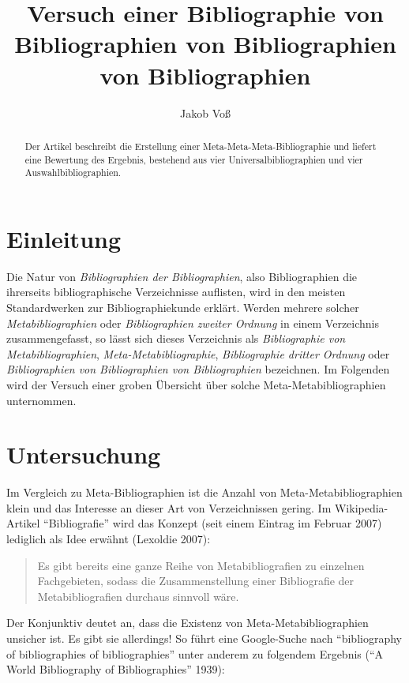 \documentclass[a4paper,
fontsize=11pt,
oneside,
numbers=noperiodatend,
parskip=half-,
bibliography=totoc,
final
]{scrartcl}
\title{\LARGE{Versuch einer Bibliographie von Bibliographien von Bibliographien von Bibliographien}} %
\author{Jakob Voß} %
\date{}
\begin{document}
\maketitle
\thispagestyle{fancyplain} 

\begin{abstract}
Der Artikel beschreibt die Erstellung einer Meta-Meta-Meta-Bibliographie
und liefert eine Bewertung des Ergebnis, bestehend aus vier
Universalbibliographien und vier Auswahlbibliographien.
\end{abstract}

\section*{Einleitung}\label{einleitung}

Die Natur von \emph{Bibliographien der Bibliographien}, also
Bibliographien die ihrerseits bibliographische Verzeichnisse auflisten,
wird in den meisten Standardwerken zur Bibliographiekunde erklärt.
Werden mehrere solcher \emph{Metabibliographien} oder
\emph{Bibliographien zweiter Ordnung} in einem Verzeichnis
zusammengefasst, so lässt sich dieses Verzeichnis als
\emph{Bibliographie von Metabibliographien},
\emph{Meta-Metabibliographie}, \emph{Bibliographie dritter Ordnung} oder
\emph{Bibliographien von Bibliographien von Bibliographien} bezeichnen.
Im Folgenden wird der Versuch einer groben Übersicht über solche
Meta-Metabibliographien unternommen.

\section*{Untersuchung}\label{untersuchung}

Im Vergleich zu Meta-Bibliographien ist die Anzahl von
Meta-Metabibliographien klein und das Interesse an dieser Art von
Verzeichnissen gering. Im Wikipedia- Artikel \enquote{Bibliografie} wird
das Konzept (seit einem Eintrag im Februar 2007) lediglich als Idee
erwähnt (Lexoldie 2007):

\begin{quote}
Es gibt bereits eine ganze Reihe von Metabibliografien zu einzelnen
Fachgebieten, sodass die Zusammenstellung einer Bibliografie der
Metabibliografien durchaus sinnvoll wäre.
\end{quote}

Der Konjunktiv deutet an, dass die Existenz von Meta-Metabibliographien
unsicher ist. Es gibt sie allerdings! So führt eine Google-Suche nach
\enquote{bibliography of bibliographies of bibliographies} unter anderem
zu folgendem Ergebnis (\enquote{A World Bibliography of Bibliographies}
1939):
\end{document}
